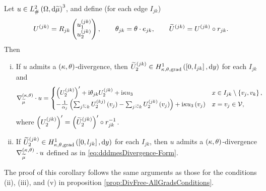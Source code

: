 \begin{cory}
	Let $u\in L^2_{\#}\left( \Omega,\mathrm{d} \widetilde{\mu} \right)^3$, and define (for each edge $I_{jk}$)
	\begin{align*}
		U^{(jk)} = R_{jk}\begin{pmatrix} u_1^{(jk)} \\ u_2^{(jk)} \end{pmatrix}, 
		\qquad \theta_{jk} = \theta\cdot e_{jk}, 
		\qquad \widetilde{U}^{(jk)} = U^{(jk)}\circ r_{jk}.
	\end{align*}	
	Then
	\begin{enumerate}[(i)]
		\item If $u$ admits a $\left( \kappa, \theta \right)$-divergence, then $\widetilde{U}_2^{(jk)}\in H^1_{\kappa,\theta,\mathrm{grad}}\left( \left[ 0,l_{jk} \right], \mathrm{d}y \right)$ for each $I_{jk}$ and 
		\begin{align} \label{eq:dddmesDivergence-Form}
			\ktgrad_{\dddmes}\cdot u &= 
			\begin{cases} 
				\bracs{U_2^{(jk)}}' + \rmi\qm_{jk}U_2^{(jk)} + \rmi\wavenumber u_3 &
				x\in I_{jk}\setminus\clbracs{v_j,v_k}, \\
				-\recip{\alpha_j}\bracs{\sum_{j\conRight k}U_2^{(kj)}\bracs{v_j} - \sum_{j\conLeft k}U_2^{(jk)}\bracs{v_j}} + \rmi\wavenumber u_3\bracs{v_j} &
				x=v_j\in\vertSet,
			\end{cases}
		\end{align}
		where $\left( U_2^{(jk)} \right)' = \left( \widetilde{U}_2^{(jk)} \right)'\circ r_{jk}^{-1}$.
		\item If $\widetilde{U}_2^{(jk)}\in H^1_{\kappa,\theta,\mathrm{grad}}\left( \left[ 0,l_{jk} \right], \mathrm{d}y \right)$ for each $I_{jk}$, then $u$ admits a $\left( \kappa, \theta \right)$-divergence $\nabla^{\left( \kappa, \theta \right)}_{\widetilde{\mu}}\cdot u$ defined as in \eqref{eq:dddmesDivergence-Form}.
	\end{enumerate}
\end{cory}
The proof of this corollary follows the same arguments as those for the conditions (ii), (iii), and (v) in proposition \ref{prop:DivFree-AllGradsConditions}.

